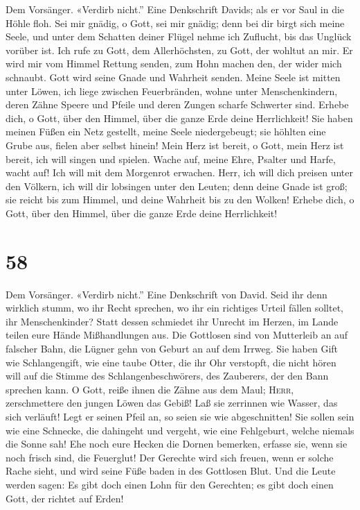  Dem Vorsänger. «Verdirb nicht.'' Eine Denkschrift Davids;
als er vor Saul in die Höhle floh. Sei mir gnädig, o Gott, sei mir
gnädig; denn bei dir birgt sich meine Seele, und unter dem Schatten
deiner Flügel nehme ich Zuflucht, bis das Unglück vorüber ist.
 Ich rufe zu Gott, dem Allerhöchsten, zu Gott, der wohltut
an mir.  Er wird mir vom Himmel Rettung senden, zum Hohn
machen den, der wider mich schnaubt. Gott wird seine Gnade und Wahrheit
senden.  Meine Seele ist mitten unter Löwen, ich liege
zwischen Feuerbränden, wohne unter Menschenkindern, deren Zähne Speere
und Pfeile und deren Zungen scharfe Schwerter sind. 
Erhebe dich, o Gott, über den Himmel, über die ganze Erde deine
Herrlichkeit!  Sie haben meinen Füßen ein Netz gestellt,
meine Seele niedergebeugt; sie höhlten eine Grube aus, fielen aber
selbst hinein!  Mein Herz ist bereit, o Gott, mein Herz
ist bereit, ich will singen und spielen.  Wache auf, meine
Ehre, Psalter und Harfe, wacht auf! Ich will mit dem Morgenrot erwachen.
 Herr, ich will dich preisen unter den Völkern, ich will
dir lobsingen unter den Leuten;  denn deine Gnade ist
groß; sie reicht bis zum Himmel, und deine Wahrheit bis zu den Wolken!
 Erhebe dich, o Gott, über den Himmel, über die ganze
Erde deine Herrlichkeit!

\hypertarget{section-57}{%
\section{58}\label{section-57}}

 Dem Vorsänger. «Verdirb nicht.'' Eine Denkschrift von
David. Seid ihr denn wirklich stumm, wo ihr Recht sprechen, wo ihr ein
richtiges Urteil fällen solltet, ihr Menschenkinder? 
Statt dessen schmiedet ihr Unrecht im Herzen, im Lande teilen eure Hände
Mißhandlungen aus.  Die Gottlosen sind von Mutterleib an
auf falscher Bahn, die Lügner gehn von Geburt an auf dem Irrweg.
 Sie haben Gift wie Schlangengift, wie eine taube Otter,
die ihr Ohr verstopft,  die nicht hören will auf die
Stimme des Schlangenbeschwörers, des Zauberers, der den Bann sprechen
kann.  O Gott, reiße ihnen die Zähne aus dem Maul;
\textsc{Herr}, zerschmettere den jungen Löwen das Gebiß! 
Laß sie zerrinnen wie Wasser, das sich verläuft! Legt er seinen Pfeil
an, so seien sie wie abgeschnitten!  Sie sollen sein wie
eine Schnecke, die dahingeht und vergeht, wie eine Fehlgeburt, welche
niemals die Sonne sah!  Ehe noch eure Hecken die Dornen
bemerken, erfasse sie, wenn sie noch frisch sind, die Feuerglut!
 Der Gerechte wird sich freuen, wenn er solche Rache
sieht, und wird seine Füße baden in des Gottlosen Blut. 
Und die Leute werden sagen: Es gibt doch einen Lohn für den Gerechten;
es gibt doch einen Gott, der richtet auf Erden!

